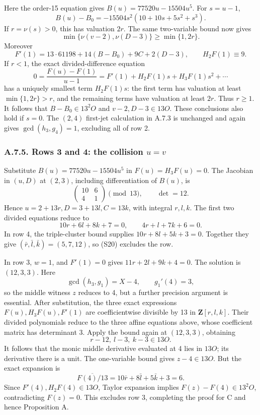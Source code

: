 \documentclass[
  british,
  10pt,
  a4paper,
]{article}
\begin{document}
Here the order-15 equation gives \(B(u)=77520u-15504u^5\). For
\(s=u-1\), \[
B(u)-B_0=-15504s^2(10+10s+5s^2+s^3).
\tag{S21}
\] If \(r=\nu(s)>0\), this has valuation \(2r\). The same two-variable
bound now gives \[
\min\{\nu(v-2),\nu(D-3)\}\ge\min\{1,2r\}.
\] Moreover \[
F'(1)=13\cdot61198+14(B-B_0)+9C+2(D-3),
\qquad H_2F(1)\equiv9.
\] If \(r<1\), the exact divided-difference equation \[
0=\frac{F(u)-F(1)}{u-1}
 =F'(1)+H_2F(1)s+H_3F(1)s^2+\cdots
\] has a uniquely smallest term \(H_2F(1)s\): the first term has
valuation at least \(\min\{1,2r\}>r\), and the remaining terms have
valuation at least \(2r\). Thus \(r\ge1\). It follows that
\(B-B_0\in13^2O\) and \(v-2,D-3\in13O\). These conclusions also hold if
\(s=0\). The \((2,4)\) first-jet calculation in A.7.3 is unchanged and
again gives \(\gcd(h_3,g_4)=1\), excluding all of row 2.

\subsubsection*{\texorpdfstring{A.7.5. Rows 3 and 4: the collision
\(u=v\)}{A.7.5. Rows 3 and 4: the collision u=v}}\label{a.7.5.-rows-3-and-4-the-collision-uv}

Substitute \(B(u)=77520u-15504u^5\) in \(F(u)=H_3F(u)=0\). The Jacobian
in \((u,D)\) at \((2,3)\), including differentiation of \(B(u)\), is \[
\begin{pmatrix}10&6\\4&1\end{pmatrix}\pmod{13},
\qquad\det=12.
\] Hence \(u=2+13r,D=3+13l,C=13k\), with integral \(r,l,k\). The first
two divided equations reduce to \[
10r+6l+8k+7=0,\qquad4r+l+7k+6=0.
\tag{S22}
\] In row 4, the triple-cluster bound supplies \(10r+8l+5k+3=0\).
Together they give \((\bar r,\bar l,\bar k)=(5,7,12)\), so (S20)
excludes the row.

In row 3, \(w=1\), and \(F'(1)=0\) gives \(11r+2l+9k+4=0\). The solution
is \((12,3,3)\). Here \[
\gcd(h_3,g_1)=X-4,\qquad g_1'(4)=3,
\] so the middle witness \(z\) reduces to 4, but a further precision
argument is essential. After substitution, the three exact expressions
\(F(u),H_3F(u),F'(1)\) are coefficientwise divisible by 13 in
\(\mathbf Z[r,l,k]\). Their divided polynomials reduce to the three
affine equations above, whose coefficient matrix has determinant 3.
Apply the bound again at \((12,3,3)\), obtaining \[
r-12,\ l-3,\ k-3\in13O.
\tag{S23}
\] It follows that the monic middle derivative evaluated at 4 lies in
\(13O\); its derivative there is a unit. The one-variable bound gives
\(z-4\in13O\). But the exact expansion is \[
\overline{F(4)/13}
=10\bar r+8\bar l+5\bar k+3=6.
\] Since \(F'(4),H_2F(4)\in13O\), Taylor expansion implies
\(F(z)-F(4)\in13^2O\), contradicting \(F(z)=0\). This excludes row 3,
completing the proof for C and hence Proposition A.
\end{document}
